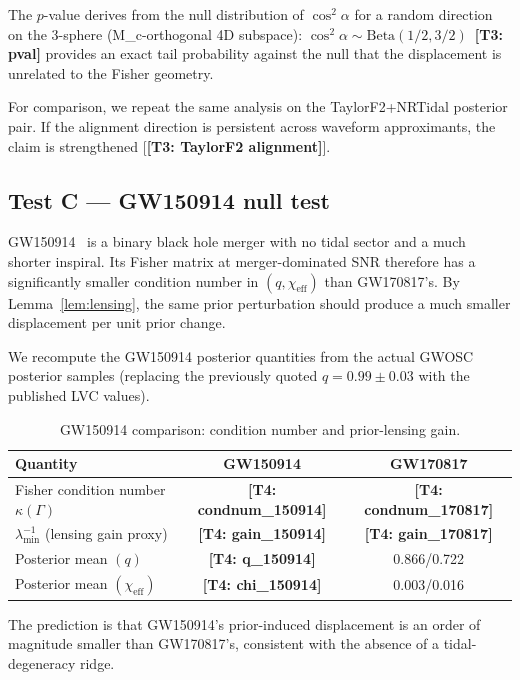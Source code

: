 \documentclass[twocolumn,prd,showpacs,superscriptaddress]{revtex4-2}
\newcommand{\chieff}{\chi_{\text{eff}}}
\newcommand{\manifest}[1]{\textbf{[#1]}}
\begin{document}
The $p$-value derives from the null distribution of $\cos^2\alpha$ for a random direction on the 3-sphere (M_c-orthogonal 4D subspace): $\cos^2\alpha \sim \text{Beta}(1/2, 3/2)$~\manifest{T3: pval} provides an exact tail probability against the null that the displacement is unrelated to the Fisher geometry.

For comparison, we repeat the same analysis on the TaylorF2+NRTidal posterior pair. If the alignment direction is persistent across waveform approximants, the claim is strengthened [\manifest{T3: TaylorF2 alignment}].

\subsection{Test C --- GW150914 null test}

GW150914~\cite{abbott2016gw150914} is a binary black hole merger with no tidal sector and a much shorter inspiral. Its Fisher matrix at merger-dominated SNR therefore has a significantly smaller condition number in $(q, \chieff)$ than GW170817's. By Lemma~\ref{lem:lensing}, the same prior perturbation should produce a much smaller displacement per unit prior change.

We recompute the GW150914 posterior quantities from the actual GWOSC posterior samples (replacing the previously quoted $q = 0.99 \pm 0.03$ with the published LVC values).

\begin{table}[tp]
\centering
\renewcommand{\arraystretch}{1.2}
\caption{GW150914 comparison: condition number and prior-lensing gain.}
\label{tab:gw150914}
\begin{tabular}{lcc}
\toprule
Quantity & GW150914 & GW170817 \\
\midrule
Fisher condition number $\kappa(\Gamma)$ & \manifest{T4: condnum_150914} & \manifest{T4: condnum_170817} \\
$\lambda_{\min}^{-1}$ (lensing gain proxy) & \manifest{T4: gain_150914} & \manifest{T4: gain_170817} \\
Posterior mean $(q)$ & \manifest{T4: q_150914} & 0.866/0.722 \\
Posterior mean $(\chieff)$ & \manifest{T4: chi_150914} & 0.003/0.016 \\
\bottomrule
\end{tabular}
\end{table}

The prediction is that GW150914's prior-induced displacement is an order of magnitude smaller than GW170817's, consistent with the absence of a tidal-degeneracy ridge.
\end{document}
